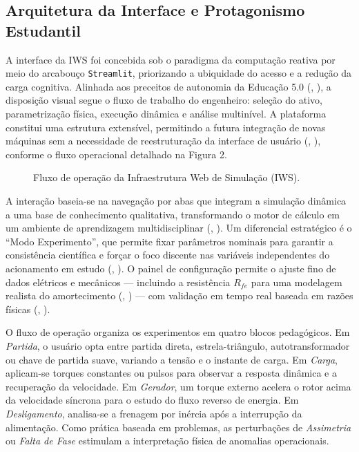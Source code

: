 \documentclass[a4paper]{ifacconf}
\begin{document}
\subsection{Arquitetura da Interface e Protagonismo Estudantil}

A interface da IWS foi concebida sob o paradigma da computação reativa por meio do arcabouço \texttt{Streamlit}, priorizando a ubiquidade do acesso e a redução da carga cognitiva. Alinhada aos preceitos de autonomia da Educação 5.0 (\citeauthor{cordeiro2024educacao}, \citeyear{cordeiro2024educacao}), a disposição visual segue o fluxo de trabalho do engenheiro: seleção do ativo, parametrização física, execução dinâmica e análise multinível. A plataforma constitui uma estrutura extensível, permitindo a futura integração de novas máquinas sem a necessidade de reestruturação da interface de usuário (\citeauthor{leedy2013simulink}, \citeyear{leedy2013simulink}), conforme o fluxo operacional detalhado na Figura 2.

\begin{figure}[htbp]
  \centering
  \resizebox{0.48\textwidth}{!}{
    
  }
  \caption{Fluxo de operação da Infraestrutura Web de Simulação (IWS).}
  \label{fig:fluxo_ems}
\end{figure}

A interação baseia-se na navegação por abas que integram a simulação dinâmica a uma base de conhecimento qualitativa, transformando o motor de cálculo em um ambiente de aprendizagem multidisciplinar (\citeauthor{souza2011ambiente}, \citeyear{souza2011ambiente}). Um diferencial estratégico é o ``Modo Experimento'', que permite fixar parâmetros nominais para garantir a consistência científica e forçar o foco discente nas variáveis independentes do acionamento em estudo (\citeauthor{tuanmohamad2024advance}, \citeyear{tuanmohamad2024advance}). O painel de configuração permite o ajuste fino de dados elétricos e mecânicos — incluindo a resistência $R_{fe}$ para uma modelagem realista do amortecimento (\citeauthor{kumari2025comparative}, \citeyear{kumari2025comparative}) — com validação em tempo real baseada em razões físicas (\citeauthor{karakas2009aggregation}, \citeyear{karakas2009aggregation}).

O fluxo de operação organiza os experimentos em quatro blocos pedagógicos. Em \textit{Partida}, o usuário opta entre partida direta, estrela-triângulo, autotransformador ou chave de partida suave, variando a tensão e o instante de carga. Em \textit{Carga}, aplicam-se torques constantes ou pulsos para observar a resposta dinâmica e a recuperação da velocidade. Em \textit{Gerador}, um torque externo acelera o rotor acima da velocidade síncrona para o estudo do fluxo reverso de energia. Em \textit{Desligamento}, analisa-se a frenagem por inércia após a interrupção da alimentação. Como prática baseada em problemas, as perturbações de \textit{Assimetria} ou \textit{Falta de Fase} estimulam a interpretação física de anomalias operacionais.
\end{document}
